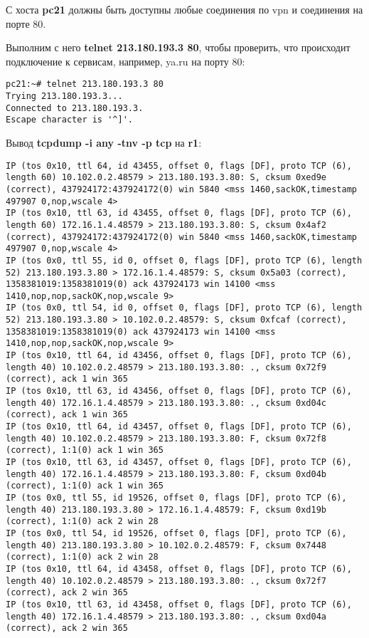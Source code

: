 \documentclass[a4paper,12pt]{article}
\begin{document}
С хоста \textbf{pc21} должны быть доступны любые соединения по vpn и
соединения на порте 80.

Выполним с него \textbf{telnet 213.180.193.3 80},  чтобы проверить, что
происходит подключение к сервисам, например, ya.ru на порту 80:
\begin{Verbatim}
pc21:~# telnet 213.180.193.3 80
Trying 213.180.193.3...
Connected to 213.180.193.3.
Escape character is '^]'.
\end{Verbatim}

Вывод \textbf{tcpdump -i any -tnv -p tcp} на \textbf{r1}:
\begin{Verbatim}
IP (tos 0x10, ttl 64, id 43455, offset 0, flags [DF], proto TCP (6), length 60) 10.102.0.2.48579 > 213.180.193.3.80: S, cksum 0xed9e (correct), 437924172:437924172(0) win 5840 <mss 1460,sackOK,timestamp 497907 0,nop,wscale 4>
IP (tos 0x10, ttl 63, id 43455, offset 0, flags [DF], proto TCP (6), length 60) 172.16.1.4.48579 > 213.180.193.3.80: S, cksum 0x4af2 (correct), 437924172:437924172(0) win 5840 <mss 1460,sackOK,timestamp 497907 0,nop,wscale 4>
IP (tos 0x0, ttl 55, id 0, offset 0, flags [DF], proto TCP (6), length 52) 213.180.193.3.80 > 172.16.1.4.48579: S, cksum 0x5a03 (correct), 1358381019:1358381019(0) ack 437924173 win 14100 <mss 1410,nop,nop,sackOK,nop,wscale 9>
IP (tos 0x0, ttl 54, id 0, offset 0, flags [DF], proto TCP (6), length 52) 213.180.193.3.80 > 10.102.0.2.48579: S, cksum 0xfcaf (correct), 1358381019:1358381019(0) ack 437924173 win 14100 <mss 1410,nop,nop,sackOK,nop,wscale 9>
IP (tos 0x10, ttl 64, id 43456, offset 0, flags [DF], proto TCP (6), length 40) 10.102.0.2.48579 > 213.180.193.3.80: ., cksum 0x72f9 (correct), ack 1 win 365
IP (tos 0x10, ttl 63, id 43456, offset 0, flags [DF], proto TCP (6), length 40) 172.16.1.4.48579 > 213.180.193.3.80: ., cksum 0xd04c (correct), ack 1 win 365
IP (tos 0x10, ttl 64, id 43457, offset 0, flags [DF], proto TCP (6), length 40) 10.102.0.2.48579 > 213.180.193.3.80: F, cksum 0x72f8 (correct), 1:1(0) ack 1 win 365
IP (tos 0x10, ttl 63, id 43457, offset 0, flags [DF], proto TCP (6), length 40) 172.16.1.4.48579 > 213.180.193.3.80: F, cksum 0xd04b (correct), 1:1(0) ack 1 win 365
IP (tos 0x0, ttl 55, id 19526, offset 0, flags [DF], proto TCP (6), length 40) 213.180.193.3.80 > 172.16.1.4.48579: F, cksum 0xd19b (correct), 1:1(0) ack 2 win 28
IP (tos 0x0, ttl 54, id 19526, offset 0, flags [DF], proto TCP (6), length 40) 213.180.193.3.80 > 10.102.0.2.48579: F, cksum 0x7448 (correct), 1:1(0) ack 2 win 28
IP (tos 0x10, ttl 64, id 43458, offset 0, flags [DF], proto TCP (6), length 40) 10.102.0.2.48579 > 213.180.193.3.80: ., cksum 0x72f7 (correct), ack 2 win 365
IP (tos 0x10, ttl 63, id 43458, offset 0, flags [DF], proto TCP (6), length 40) 172.16.1.4.48579 > 213.180.193.3.80: ., cksum 0xd04a (correct), ack 2 win 365
\end{Verbatim}
\end{document}

